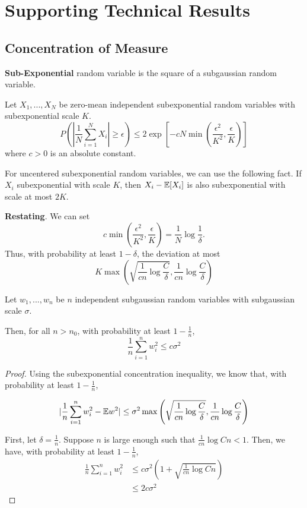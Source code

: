 \documentclass{article}
\begin{document}
\section{Supporting Technical Results}

\subsection{Concentration of Measure}

\textbf{Sub-Exponential} random variable is the square of a subgaussian random variable.

\begin{proposition} 
Let $X_1,...,X_N$ be zero-mean independent subexponential random variables with subexponential scale $K$. 
\[
P( | \frac{1}{N} \sum_{i=1}^N X_i | \geq \epsilon) \leq
	2 \exp \left[ -c N \min\left( \frac{\epsilon^2}{K^2}, \frac{\epsilon}{K} \right) \right]
\]
where $c > 0$ is an absolute constant.
\end{proposition}

For uncentered subexponential random variables, we can use the following fact. If $X_i$ subexponential with scale $K$, then $X_i - \mathbb{E}[X_i]$ is also subexponential with scale at most $2K$.

\textbf{Restating}. We can set
\[
c \min\left( \frac{\epsilon^2}{K^2}, \frac{\epsilon}{K} \right) = \frac{1}{N} \log \frac{1}{\delta}.
\]
Thus, with probability at least $1-\delta$, the deviation at most
\[
K \max\left( \sqrt{\frac{1}{cn} \log \frac{C}{\delta}},  \frac{1}{cn} \log \frac{C}{\delta} \right)
\]

\begin{corollary}
Let $w_1,...,w_n$ be $n$ independent subgaussian random variables with subgaussian scale $\sigma$. 

Then, for all $n > n_0$, with probability at least $1- \frac{1}{n}$,
\[
\frac{1}{n} \sum_{i=1}^n w_i^2 \leq c \sigma^2 
\]
\end{corollary}

\begin{proof}
Using the subexponential concentration inequality, we know that, with probability at least $1-\frac{1}{n}$, 

\[
| \frac{1}{n} \sum_{i=1}^n w_i^2 - \mathbb{E} w^2 | \leq \sigma^2 \max\left( \sqrt{\frac{1}{cn} \log \frac{C}{\delta}}, \frac{1}{cn}\log \frac{C}{\delta} \right)
\]

First, let $\delta = \frac{1}{n}$. Suppose $n$ is large enough such that $ \frac{1}{cn} \log Cn < 1$. Then, we have, with probability at least $1-\frac{1}{n}$,
\begin{align*}
 \frac{1}{n} \sum_{i=1}^n w_i^2 &\leq c\sigma^2 (1+\sqrt{\frac{1}{cn} \log Cn}) \\
		&\leq 2 c \sigma^2
 \end{align*}
 
\end{proof}
\end{document}
